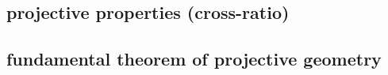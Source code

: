\subsection{projective properties (cross-ratio)}
\subsection{fundamental theorem of projective geometry}


